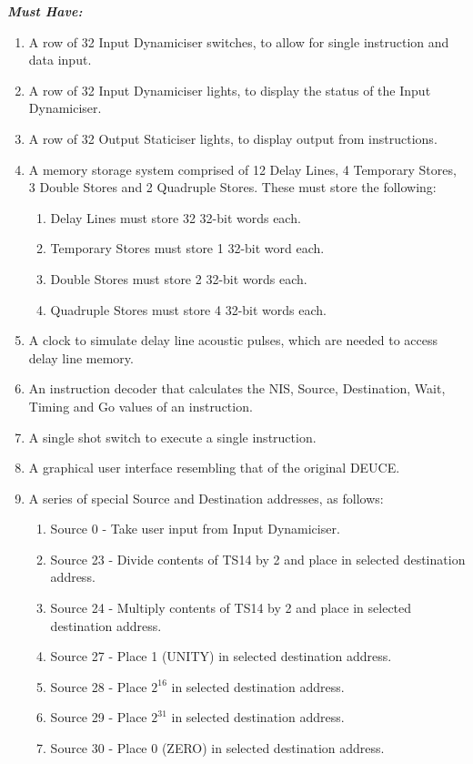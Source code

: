 \documentclass{l4proj}
\begin{document}
\textbf{\textit{Must Have:}}
\begin{enumerate}
	\item A row of 32 Input Dynamiciser switches, to allow for single instruction and data input.
	\item A row of 32 Input Dynamiciser lights, to display the status of the Input Dynamiciser.
	\item A row of 32 Output Staticiser lights, to display output from instructions.
	\item A memory storage system comprised of 12 Delay Lines, 4 Temporary Stores, 3 Double Stores and 2 Quadruple Stores. These must store the following:
	\begin{enumerate}
		\item Delay Lines must store 32 32-bit words each.
		\item Temporary Stores must store 1 32-bit word each.
		\item Double Stores must store 2 32-bit words each.
		\item Quadruple Stores must store 4 32-bit words each.
	\end{enumerate}
	\item A clock to simulate delay line acoustic pulses, which are needed to access delay line memory.
	\item An instruction decoder that calculates the NIS, Source, Destination, Wait, Timing and Go values of an instruction.
	\item A single shot switch to execute a single instruction.
	\item A graphical user interface resembling that of the original DEUCE.
	\item A series of special Source and Destination addresses, as follows:
	\begin{enumerate}
		\item Source 0 - Take user input from Input Dynamiciser.
		\item Source 23 - Divide contents of TS14 by 2 and place in selected destination address.
		\item Source 24 - Multiply contents of TS14 by 2 and place in selected destination address.
		\item Source 27 - Place 1 (UNITY) in selected destination address.
		\item Source 28 - Place $ 2^{16} $ in selected destination address.
		\item Source 29 - Place $ 2^{31} $ in selected destination address.
		\item Source 30 - Place 0 (ZERO) in selected destination address.

\end{enumerate}
\end{enumerate}
\end{document}
